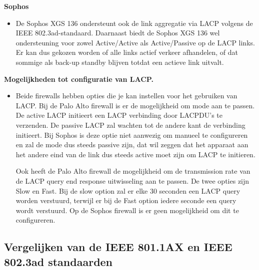 \textbf{Sophos}
\begin{itemize}[label=\textbullet]
    \item De Sophos XGS 136 ondersteunt ook de link aggregatie via LACP volgens de IEEE 802.3ad-standaard. Daarnaast biedt de Sophos XGS 136 wel ondersteuning voor zowel Active/Active als Active/Passive op de LACP links. Er kan dus gekozen worden of alle links actief verkeer afhandelen, of dat sommige als back-up standby blijven totdat een actieve link uitvalt.
\end{itemize}

\textbf{Mogelijkheden tot configuratie van LACP.}
\begin{itemize}[label=\textbullet]
    \item Beide firewalls hebben opties die je kan instellen voor het gebruiken van LACP. Bij de Palo Alto firewall is er de mogelijkheid om mode aan te passen. De active LACP initieert een LACP verbinding door LACPDU's te verzenden. De passive LACP zal wachten tot de andere kant de verbinding initieert. Bij Sophos is deze optie niet aanwezig om manueel te configureren en zal de mode dus steeds passive zijn, dat wil zeggen dat het apparaat aan het andere eind van de link dus steeds active moet zijn om LACP te initieren.
    
    Ook heeft de Palo Alto firewall de mogelijkheid om de transmission rate van de LACP query end response uitwisseling aan te passen. De twee opties zijn Slow en Fast. Bij de slow option zal er elke 30 seconden een LACP query worden verstuurd, terwijl er bij de Fast option iedere seconde een query wordt verstuurd. Op de Sophos firewall is er geen mogelijkheid om dit te configureren.
\end{itemize}


\subsection{Vergelijken van de IEEE 801.1AX en IEEE 802.3ad standaarden}

